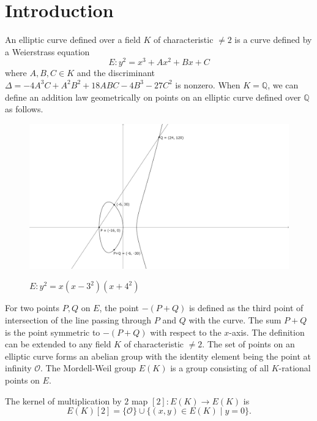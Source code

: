 \documentclass[main]{subfiles}
\begin{document}
\section{Introduction}

An elliptic curve defined over a field $K$ of characteristic $\neq 2$ is a curve defined by a Weierstrass equation
\begin{equation*}
    E: y^{2} = x^{3} + Ax^2 + Bx + C
\end{equation*}
where $A,B,C \in K$ and the discriminant $\Delta = -4A^3C + A^2B^2 + 18ABC - 4B^3 - 27C^2$ is nonzero.
When $K=\mathbb{Q}$, we can define an addition law geometrically on points on an elliptic curve defined over $\mathbb{Q}$ as follows.
\begin{figure}[H]
    \centering
    \caption{$E: y^2 = x(x-3^2)(x+4^2)$}
    \includegraphics[keepaspectratio, width=\linewidth]{figures/3-4-5.png}
    \label{fig:elliptic_curve}
\end{figure}
For two points $P,Q$ on $E$, the point $-(P+Q)$ is defined as the third point of intersection of the line passing through $P$ and $Q$ with the curve.
The sum $P+Q$ is the point symmetric to $-(P+Q)$ with respect to the $x$-axis.
The definition can be extended to any field $K$ of characteristic $\neq 2$.
The set of points on an elliptic curve forms an abelian group with the identity element being the point at infinity $\mathcal{O}$.
The Mordell-Weil group $E(K)$ is a group consisting of all $K$-rational points on $E$.

\begin{prop}
    The kernel of multiplication by $2$ map $[2]: E(K) \to E(K)$ is
    \begin{equation*}
        E(K)[2] = \{ \mathcal{O} \} \cup \{ (x,y) \in E(K) \mid y = 0 \}.
    \end{equation*}
\end{prop}
\end{document}
